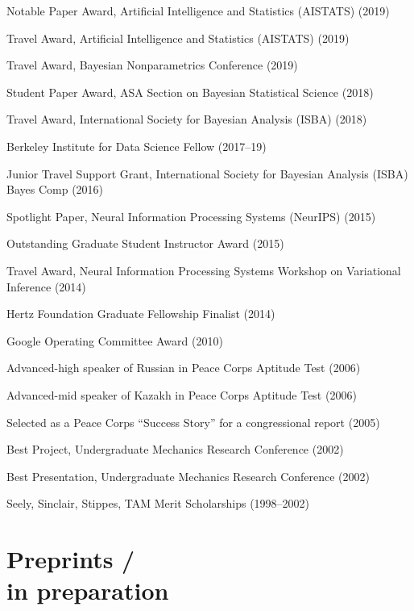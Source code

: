 \documentclass[margin,line]{res}
\newenvironment{list1}{
  \begin{list}{\ding{113}}{%
      \setlength{\itemsep}{0in}
      \setlength{\parsep}{0in} \setlength{\parskip}{0in}
      \setlength{\topsep}{0in} \setlength{\partopsep}{0in}
      \setlength{\leftmargin}{0in}}}{\end{list}} %
\newcommand{\me}{\textbf{R.~J.~Giordano}\xspace}
\newcommand{\tamara}{T.~Broderick\xspace}
\begin{document}
\begin{resume}
\begin{list1}
\item[] Notable Paper Award, Artificial Intelligence and Statistics (AISTATS) (2019)
\item[] Travel Award, Artificial Intelligence and Statistics (AISTATS) (2019)
\item[] Travel Award, Bayesian Nonparametrics Conference (2019)
\item[] Student Paper Award, ASA Section on Bayesian Statistical Science (2018)
\item[] Travel Award, International Society for Bayesian Analysis (ISBA) (2018)
\item[] Berkeley Institute for Data Science Fellow (2017--19)
\item[] Junior Travel Support Grant, International Society for Bayesian Analysis (ISBA) Bayes Comp (2016)
\item[] Spotlight Paper, Neural Information Processing Systems (NeurIPS) (2015)
\item[] Outstanding Graduate Student Instructor Award (2015)
\item[] Travel Award, Neural Information Processing Systems Workshop on Variational Inference (2014)
\item[] Hertz Foundation Graduate Fellowship Finalist (2014)
\item[] Google Operating Committee Award (2010)
\item[] Advanced-high speaker of Russian in Peace Corps Aptitude Test (2006)
\item[] Advanced-mid speaker of Kazakh in Peace Corps Aptitude Test (2006)
\item[] Selected as a Peace Corps ``Success Story'' for a congressional report (2005)
\item[] Best Project, Undergraduate Mechanics Research Conference (2002)
\item[] Best Presentation, Undergraduate Mechanics Research Conference (2002)
\item[] Seely, Sinclair, Stippes, TAM Merit Scholarships (1998--2002)

\end{list1}

\clearpage
\section{\sc Preprints / \\in preparation}



\end{resume}
\end{document}
